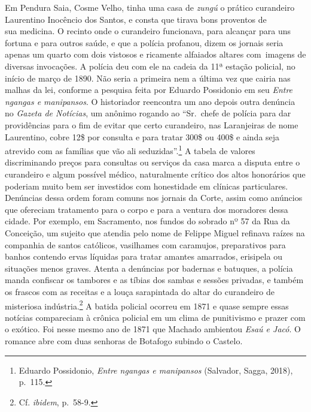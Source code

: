Em Pendura Saia, Cosme Velho, tinha uma casa de \emph{zungú} o prático
curandeiro Laurentino Inocêncio dos Santos, e consta que tirava bons
proventos de~\\
sua medicina. O recinto onde o curandeiro funcionava, para alcançar para
uns fortuna e para outros saúde, e que a polícia profanou, dizem os
jornais seria apenas um quarto com dois vistosos e ricamente alfaiados
altares com~imagens de diversas invocações. A polícia deu com ele na
cadeia da 11ª estação policial, no início de março de 1890. Não seria a
primeira nem a última vez que cairia nas malhas da lei, conforme a
pesquisa feita por Eduardo Possidonio em seu \emph{Entre ngangas e
manipansos}. O historiador reencontra um ano depois outra denúncia no
\emph{Gazeta de Notícias}, um anônimo rogando ao ``Sr.~chefe de polícia
para dar providências para o fim de evitar que certo curandeiro, nas
Laranjeiras de nome Laurentino, cobre 12\$ por consulta e para tratar
300\$ ou 400\$ e ainda seja atrevido com as famílias que vão ali
seduzidas''.\footnote{Eduardo Possidonio, \emph{Entre ngangas e
  manipansos} (Salvador, Sagga, 2018), p.~115.} A tabela de valores
discriminando preços para consultas ou serviços da casa marca a disputa
entre o curandeiro e algum possível médico, naturalmente crítico dos
altos honorários que poderiam muito bem ser investidos com honestidade
em clínicas particulares. Denúncias dessa ordem foram comuns nos jornais
da Corte, assim como anúncios que ofereciam tratamento para o corpo e
para a ventura dos moradores dessa cidade. Por exemplo, em Sacramento,
nos fundos do sobrado nº 57 da Rua da Conceição, um sujeito que atendia
pelo nome de Felippe Miguel refinava raízes na companhia de santos
católicos, vasilhames com caramujos, preparativos para banhos contendo
ervas líquidas para tratar amantes amarrados, erisipela ou situações
menos graves. Atenta a denúncias por badernas e batuques, a polícia
manda confiscar os tambores e as tíbias dos sambas e sessões privadas, e
também os frascos com as receitas e a louça sarapintada do altar do
curandeiro de misteriosa indústria.\footnote{Cf. \emph{ibidem}, p.~58-9.}
A batida policial ocorreu em 1871 e quase sempre essas notícias
compareciam à crônica policial em um clima de punitivismo e prazer com o
exótico. Foi nesse mesmo ano de 1871 que Machado ambientou \emph{Esaú e
Jacó}. O romance abre com duas senhoras de Botafogo subindo o Castelo.

